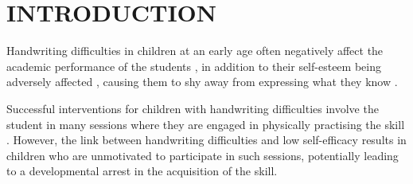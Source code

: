 \documentclass{sig-alternate}
\begin{document}
\section{INTRODUCTION}

Handwriting difficulties in children at an early age often negatively affect
the academic performance of the students \cite{Christensen2005}, in addition to
their self-esteem being adversely affected \cite{Malloy1995}, causing them to
shy away from expressing what they know \cite{Medwell2008}.

Successful interventions for children with handwriting difficulties involve the
student in many sessions where they are engaged in physically practising the
skill \cite{Hoy2011}. However, the link between handwriting difficulties and low
self-efficacy \cite{Engel-Yeger2009} results in children who are unmotivated to
participate in such sessions, potentially leading to a developmental arrest in
the acquisition of the skill. 

\end{document}
